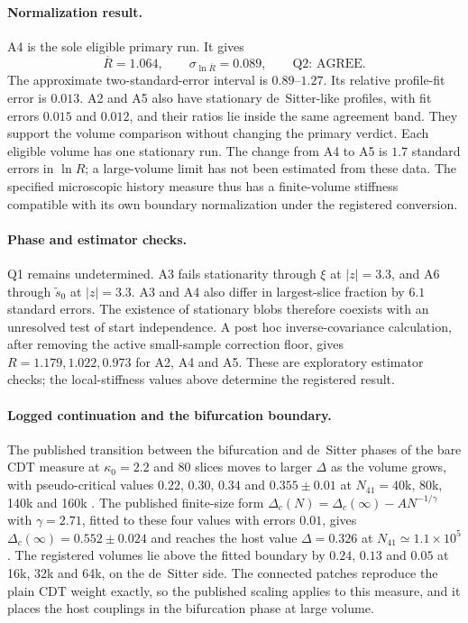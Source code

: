 \paragraph{Normalization result.}
A4 is the sole eligible primary run. It gives
\[
 \overline R=1.064,\qquad \sigma_{\ln\overline R}=0.089,
 \qquad \text{Q2: AGREE}.
\]
The approximate two-standard-error interval is $0.89$--$1.27$.
Its relative profile-fit error is $0.013$. A2 and A5 also have stationary
de~Sitter-like profiles, with fit errors $0.015$ and $0.012$, and their
ratios lie inside the same agreement band. They support the volume
comparison without changing the primary verdict. Each eligible volume
has one stationary run. The change from A4 to A5 is $1.7$ standard errors
in $\ln R$; a large-volume limit has not been estimated from these data.
The specified microscopic history measure thus has a finite-volume
stiffness compatible with its own boundary normalization under the
registered conversion.

\paragraph{Phase and estimator checks.}
Q1 remains \textsf{undetermined}. A3 fails stationarity through $\xi$
at $|z|=3.3$, and A6 through $\widetilde s_0$ at $|z|=3.3$.
A3 and A4 also differ in largest-slice fraction by $6.1$ standard errors.
The existence of stationary blobs therefore coexists with an unresolved
test of start independence. A post hoc inverse-covariance calculation,
after removing the active small-sample correction floor, gives
$R=1.179,1.022,0.973$ for A2, A4 and A5. These are exploratory estimator
checks; the local-stiffness values above determine the registered result.

\paragraph{Logged continuation and the bifurcation boundary.}
The published transition between the bifurcation and de~Sitter phases of
the bare CDT measure at $\kappa_0=2.2$ and $80$ slices moves to larger
$\Delta$ as the volume grows, with pseudo-critical values $0.22$, $0.30$,
$0.34$ and $0.355\pm0.01$ at $N_{41}=40$k, 80k, 140k and 160k
\cite{coumbe,higherorder}. The published finite-size form
$\Delta_c(N)=\Delta_c(\infty)-AN^{-1/\gamma}$ with $\gamma=2.71$, fitted to
these four values with errors $0.01$, gives
$\Delta_c(\infty)=0.552\pm0.024$ and reaches the host value
$\Delta=0.326$ at $N_{41}\simeq1.1\times10^5$. The registered volumes lie
above the fitted boundary by $0.24$, $0.13$ and $0.05$ at 16k, 32k and
64k, on the de~Sitter side. The connected patches reproduce the plain CDT
weight exactly, so the published scaling applies to this measure, and it
places the host couplings in the bifurcation phase at large volume.

